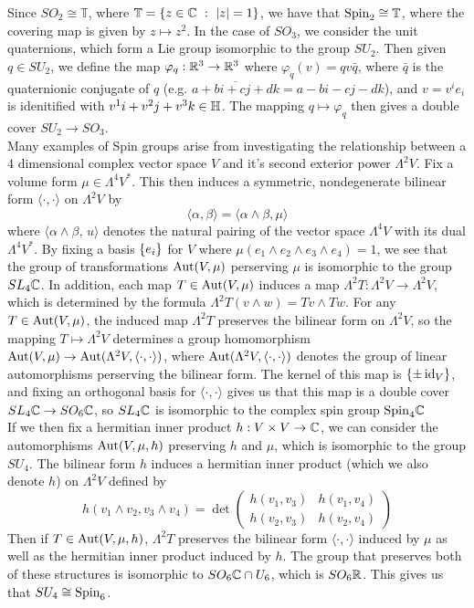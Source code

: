 %
Since $SO_2 \cong \mathbb{T}$, where $\mathbb{T} = \left\lbrace z \in \mathbb{C} ~:~ |z| = 1 \right\rbrace$,
we have that $\mathrm{Spin}_2 \cong \mathbb{T}$, where the covering map is given
by $z \mapsto z^2$. In the case of $SO_3$, we consider the unit quaternions,
which form a Lie group isomorphic to the group $SU_2$. Then given $q \in SU_2$, we define
the map $\varphi_q : \mathbb{R}^3 \to \mathbb{R}^3$ where $\varphi_q(v) = qv\bar{q}$, where
$\bar{q}$ is the quaternionic conjugate of $q$ (e.g. $\overline{a + bi + cj +dk}
= a -bi -cj -dk$), and $v = v^ie_i$ is idenitified with $v^1 i + v^2j + v^3k \in \mathbb{H}$.
The mapping $q \mapsto \varphi_q$ then gives a double cover $SU_2 \to SO_3$. \\

Many examples of Spin groups arise from investigating the relationship between
a $4$ dimensional complex vector space $V$ and it's second exterior power
$\Lambda^2V$. Fix a volume form $\mu \in \Lambda^4V^*$. This then induces a
symmetric, nondegenerate bilinear form $\langle \cdot,\cdot \rangle$ on
$\Lambda^2V$ by
\[
\langle \alpha,\beta \rangle = \langle \alpha \wedge \beta, \mu \rangle
\]
where $\langle \alpha \wedge \beta, \,u \rangle$ denotes the natural pairing of
the vector space $\Lambda^4V$ with its dual $\Lambda^4V^*$. By fixing
a basis $\left\lbrace e_i \right\rbrace$ for $V$ where $\mu(e_1 \wedge e_2 \wedge e_3 \wedge e_4) = 1$,
we see that the group of transformations $\operatorname{Aut}(V, \mu)$ perserving $\mu$ is
isomorphic to the group $SL_4\mathbb{C}$. In addition, each map $T \in \operatorname{Aut}(V, \mu)$
induces a map $\Lambda^2 T : \Lambda^2V \to \Lambda^2V$, which is determined
by the formula $\Lambda^2 T(v \wedge w) = Tv \wedge Tw$. For any $T \in \operatorname{Aut}(V, \mu)$,
the induced map $\Lambda^2 T$ preserves the bilinear form on $\Lambda^2V$, so the
mapping $T \mapsto \Lambda^2V$ determines a group homomorphism
$\operatorname{Aut}(V, \mu) \to \operatorname{Aut}(\Lambda^2V, \langle \cdot,\cdot \rangle)$, where
$\operatorname{Aut}(\Lambda^2V,\langle\cdot,\cdot\rangle)$ denotes the group of linear automorphisms
perserving the bilinear form. The kernel of this map is $\left\lbrace \pm \operatorname{id}_V \right\rbrace$, and fixing
an orthogonal basis for $\langle\cdot,\cdot\rangle$ gives us that this map is
a double cover $SL_4\mathbb{C} \to SO_6\mathbb{C}$, so $SL_4\mathbb{C}$ is isomorphic to the
complex spin group $\mathrm{Spin}_4\mathbb{C}$ \\

If we then fix a hermitian inner product $h : V \times V \to \mathbb{C}$, we can
consider the automorphisms $\operatorname{Aut}(V, \mu, h)$ preserving $h$ and $\mu$, which
is isomorphic to the group $SU_4$. The bilinear form $h$ induces a hermitian
inner product (which we also denote $h$) on $\Lambda^2V$ defined by
\[
h(v_1 \wedge v_2, v_3 \wedge v_4) = \det \begin{pmatrix}
h(v_1,v_3) & h(v_1, v_4) \\
h(v_2,v_3) & h(v_2,v_4)
\end{pmatrix}
\]
Then if $T \in \operatorname{Aut}(V,\mu,h)$, $\Lambda^2T$ preserves the bilinear form
$\langle\cdot,\cdot\rangle$ induced by $\mu$ as well as the hermitian inner
product induced by $h$. The group that preserves both of these structures
is isomorphic to $SO_6\mathbb{C} \cap U_6$, which is $SO_6\mathbb{R}$. This gives us that
$SU_4 \cong \mathrm{Spin}_6$. \\

